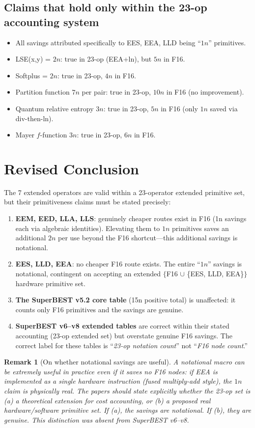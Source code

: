 \documentclass[11pt]{article}
\newtheorem{remark}[theorem]{Remark}
\begin{document}
\subsection{Claims that hold only within the 23-op accounting system}

\begin{itemize}
  \item All savings attributed specifically to EES, EEA, LLD being ``$1n$'' primitives.
  \item LSE(x,y) = $2n$: true in 23-op (EEA+ln), but $5n$ in F16.
  \item Softplus = $2n$: true in 23-op, $4n$ in F16.
  \item Partition function $7n$ per pair: true in 23-op, $10n$ in F16 (no improvement).
  \item Quantum relative entropy $3n$: true in 23-op, $5n$ in F16 (only $1n$ saved via div-then-ln).
  \item Mayer $f$-function $3n$: true in 23-op, $6n$ in F16.
\end{itemize}

\section{Revised Conclusion}

The 7 extended operators are valid within a 23-operator extended primitive set,
but their primitiveness claims must be stated precisely:

\begin{enumerate}
  \item \textbf{EEM, EED, LLA, LLS}: genuinely cheaper routes exist in F16 (1n savings each via algebraic identities). Elevating them to $1n$ primitives saves an additional $2n$ per use beyond the F16 shortcut---this additional savings is notational.
  \item \textbf{EES, LLD, EEA}: no cheaper F16 route exists. The entire ``$1n$'' savings is notational, contingent on accepting an extended $\{$F16 $\cup$ \{EES, LLD, EEA\}$\}$ hardware primitive set.
  \item \textbf{The SuperBEST v5.2 core table} (15n positive total) is unaffected: it counts only F16 primitives and the savings are genuine.
  \item \textbf{SuperBEST v6--v8 extended tables} are correct within their stated accounting (23-op extended set) but overstate genuine F16 savings. The correct label for these tables is ``\emph{23-op notation count}'' not ``\emph{F16 node count}.''
\end{enumerate}

\begin{remark}[On whether notational savings are useful]
A notational macro can be extremely useful in practice even if it saves no F16 nodes:
if EEA is implemented as a single hardware instruction (fused multiply-add style),
the $1n$ claim is physically real. The papers should state explicitly whether the
23-op set is (a) a theoretical extension for cost accounting, or (b) a proposed
real hardware/software primitive set. If (a), the savings are notational. If (b),
they are genuine. This distinction was absent from SuperBEST v6--v8.
\end{remark}
\end{document}
